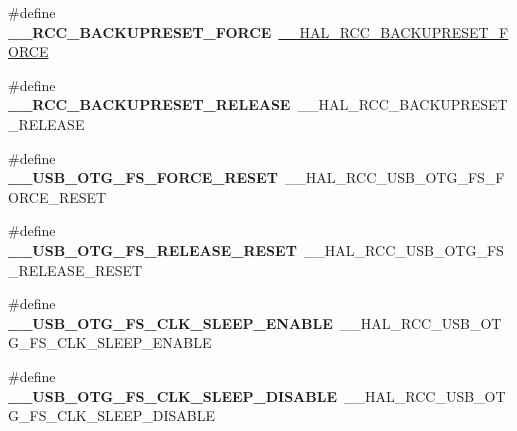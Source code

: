 \begin{DoxyCompactItemize}
\#define {\bfseries \+\_\+\+\_\+\+R\+C\+C\+\_\+\+B\+A\+C\+K\+U\+P\+R\+E\+S\+E\+T\+\_\+\+F\+O\+R\+CE}~\mbox{\hyperlink{group___r_c_c___internal___r_t_c___clock___configuration_ga3bf7da608ff985873ca8e248fb1dc4f0}{\+\_\+\+\_\+\+H\+A\+L\+\_\+\+R\+C\+C\+\_\+\+B\+A\+C\+K\+U\+P\+R\+E\+S\+E\+T\+\_\+\+F\+O\+R\+CE}}
\item 
\mbox{\label{group___h_a_l___r_c_c___aliased_ga16e2165e9541a9ffbf34614eb6ef91c2}} 
\#define {\bfseries \+\_\+\+\_\+\+R\+C\+C\+\_\+\+B\+A\+C\+K\+U\+P\+R\+E\+S\+E\+T\+\_\+\+R\+E\+L\+E\+A\+SE}~\+\_\+\+\_\+\+H\+A\+L\+\_\+\+R\+C\+C\+\_\+\+B\+A\+C\+K\+U\+P\+R\+E\+S\+E\+T\+\_\+\+R\+E\+L\+E\+A\+SE
\item 
\mbox{\label{group___h_a_l___r_c_c___aliased_ga4cbf3d0cd9c1f29b7f38cd672a7f81a3}} 
\#define {\bfseries \+\_\+\+\_\+\+U\+S\+B\+\_\+\+O\+T\+G\+\_\+\+F\+S\+\_\+\+F\+O\+R\+C\+E\+\_\+\+R\+E\+S\+ET}~\+\_\+\+\_\+\+H\+A\+L\+\_\+\+R\+C\+C\+\_\+\+U\+S\+B\+\_\+\+O\+T\+G\+\_\+\+F\+S\+\_\+\+F\+O\+R\+C\+E\+\_\+\+R\+E\+S\+ET
\item 
\mbox{\label{group___h_a_l___r_c_c___aliased_ga0c1425084511fd2205b412ee47165041}} 
\#define {\bfseries \+\_\+\+\_\+\+U\+S\+B\+\_\+\+O\+T\+G\+\_\+\+F\+S\+\_\+\+R\+E\+L\+E\+A\+S\+E\+\_\+\+R\+E\+S\+ET}~\+\_\+\+\_\+\+H\+A\+L\+\_\+\+R\+C\+C\+\_\+\+U\+S\+B\+\_\+\+O\+T\+G\+\_\+\+F\+S\+\_\+\+R\+E\+L\+E\+A\+S\+E\+\_\+\+R\+E\+S\+ET
\item 
\mbox{\label{group___h_a_l___r_c_c___aliased_ga86e49075f8526ea61ca22a6f83ca65d7}} 
\#define {\bfseries \+\_\+\+\_\+\+U\+S\+B\+\_\+\+O\+T\+G\+\_\+\+F\+S\+\_\+\+C\+L\+K\+\_\+\+S\+L\+E\+E\+P\+\_\+\+E\+N\+A\+B\+LE}~\+\_\+\+\_\+\+H\+A\+L\+\_\+\+R\+C\+C\+\_\+\+U\+S\+B\+\_\+\+O\+T\+G\+\_\+\+F\+S\+\_\+\+C\+L\+K\+\_\+\+S\+L\+E\+E\+P\+\_\+\+E\+N\+A\+B\+LE
\item 
\mbox{\label{group___h_a_l___r_c_c___aliased_ga5e698c23794023e6a3bc1d636f969d29}} 
\#define {\bfseries \+\_\+\+\_\+\+U\+S\+B\+\_\+\+O\+T\+G\+\_\+\+F\+S\+\_\+\+C\+L\+K\+\_\+\+S\+L\+E\+E\+P\+\_\+\+D\+I\+S\+A\+B\+LE}~\+\_\+\+\_\+\+H\+A\+L\+\_\+\+R\+C\+C\+\_\+\+U\+S\+B\+\_\+\+O\+T\+G\+\_\+\+F\+S\+\_\+\+C\+L\+K\+\_\+\+S\+L\+E\+E\+P\+\_\+\+D\+I\+S\+A\+B\+LE
\item 

\end{DoxyCompactItemize}
